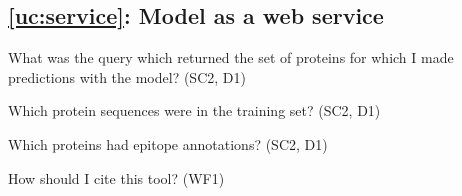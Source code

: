 \subsection{\ref{uc:service}: Model as a web service}

\begin{provquestions}[resume]
    \item What was the query which returned the set of proteins for which I made predictions with the model? (SC2, D1)
    \item Which protein sequences were in the training set? (SC2, D1)
    \item Which proteins had epitope annotations? (SC2, D1)
    \item How should I cite this tool? (WF1)
\end{provquestions}